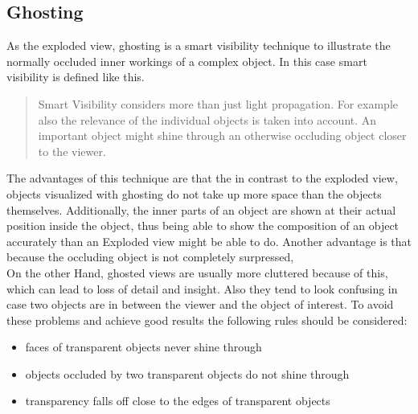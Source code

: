 \subsection{Ghosting}
As the exploded view, ghosting is a smart visibility technique to illustrate the normally occluded inner workings of a complex object. In this case smart visibility is defined like this.
\begin{quote}Smart Visibility considers more than just light propagation. For example also the relevance of the individual objects is taken into account. An important object might shine through an otherwise occluding object closer to the viewer. \cite{Viola:2005:SVV:2381219.2381249}\end{quote}
The advantages of this technique are that the in contrast to the exploded view, objects visualized with ghosting do not take up more space than the objects themselves. Additionally, the inner parts of an object are shown at their actual position inside the object, thus being able to show the composition of an object accurately than an Exploded view might be able to do. Another advantage is that because the occluding object is not completely surpressed, \\
On the other Hand, ghosted views are usually more cluttered because of this, which can lead to loss of detail and insight. Also they tend to look confusing in case two objects are in between the viewer and the object of interest. To avoid these problems and achieve good results the following rules should be considered:\cite{Viola:2005:SVV:2381219.2381249}
\begin{itemize}
\item faces of transparent objects never shine through
\item objects occluded by two transparent objects do not shine through
\item transparency falls off close to the edges of transparent objects
\end{itemize}
